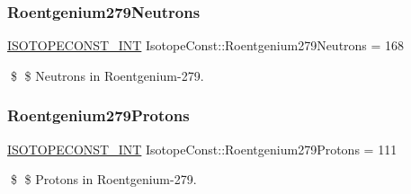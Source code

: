 \subsubsection{\texorpdfstring{Roentgenium279\+Neutrons}{Roentgenium279Neutrons}}
{\footnotesize\ttfamily \mbox{\hyperlink{group___isotope_const-_macros_ga5f18360b3e99483a35c32d789e62621c}{I\+S\+O\+T\+O\+P\+E\+C\+O\+N\+S\+T\+\_\+\+I\+NT}} Isotope\+Const\+::\+Roentgenium279\+Neutrons = 168}

\$ \$ Neutrons in Roentgenium-\/279. \mbox{\label{group___isotope_const-_roentgenium-_rg279_gaf07c59fbece0183abcf67344f6b9e619}} 
\subsubsection{\texorpdfstring{Roentgenium279\+Protons}{Roentgenium279Protons}}
{\footnotesize\ttfamily \mbox{\hyperlink{group___isotope_const-_macros_ga5f18360b3e99483a35c32d789e62621c}{I\+S\+O\+T\+O\+P\+E\+C\+O\+N\+S\+T\+\_\+\+I\+NT}} Isotope\+Const\+::\+Roentgenium279\+Protons = 111}

\$ \$ Protons in Roentgenium-\/279. 
